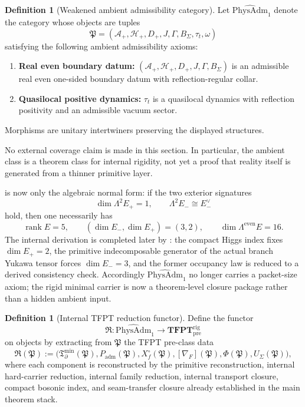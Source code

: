 \documentclass[11pt,a4paper]{article}
\theoremstyle{definition}
\newtheorem{definition}[theorem]{Definition}
\theoremstyle{remark}
\DeclareMathOperator{\rank}{rank}
\newcommand{\Tbound}{\mathfrak T_{\partial}^{\min}}
\newcommand{\Padm}{P_{\mathrm{adm}}}
\newcommand{\PhysAdmOne}{\widehat{\mathrm{PhysAdm}}_1}
\newcommand{\Runiv}{\mathfrak R}
\begin{document}
\begin{definition}[Weakened ambient admissibility category]
\label{def:physadm}
Let $\PhysAdmOne$ denote the category whose objects are tuples
\[
\mathfrak P=
(\mathcal A_+,\mathcal H_+,D_+,J,\Gamma,B_\Sigma,\tau_t,\omega)
\]
satisfying the following ambient admissibility axioms:
\begin{enumerate}[leftmargin=2em, topsep=3pt, itemsep=3pt]
    \item[\textbf{(U1)}] \textbf{Real even boundary datum:}
    $(\mathcal A_+,\mathcal H_+,D_+,J,\Gamma,B_\Sigma)$ is an admissible real even one-sided
    boundary datum with reflection-regular collar.
    \item[\textbf{(U4)}] \textbf{Quasilocal positive dynamics:}
    $\tau_t$ is a quasilocal dynamics with reflection positivity and an admissible vacuum sector.
\end{enumerate}
Morphisms are unitary intertwiners preserving the displayed structures.
\end{definition}

No external coverage claim is made in this section. In particular, the ambient class is a theorem
class for internal rigidity, not yet a proof that reality itself is generated from a thinner
primitive layer.

\begin{tcolorbox}[colback=orange!5, colframe=orange!70!black, breakable,
    title={Carrier closure is now split cleanly},
    colbacktitle=orange!75!black]
 is now only the algebraic normal form: if the two exterior
signatures
\[
\dim\Lambda^2E_+=1,
\qquad
\Lambda^2E_-\cong E_-^\vee
\]
hold, then one necessarily has
\[
\rank E=5,
\qquad
(\dim E_-,\dim E_+)=(3,2),
\qquad
\dim\Lambda^{\mathrm{even}}E=16.
\]
The internal derivation is completed later by :
the compact Higgs index fixes $\dim E_+=2$, the primitive indecomposable generator of the actual
branch Yukawa tensor forces $\dim E_-=3$, and the former occupancy law is reduced to a derived
consistency check.
Accordingly $\PhysAdmOne$ no longer carries a packet-size axiom; the rigid minimal carrier is now a
theorem-level closure package rather than a hidden ambient input.
\end{tcolorbox}

\begin{definition}[Internal TFPT reduction functor]
\label{def:universal-reduction}
Define the functor
\[
\Runiv:\PhysAdmOne\to \mathbf{TFPT}^{\mathrm{rig}}_{\mathrm{pre}}
\]
on objects by extracting from $\mathfrak P$ the TFPT pre-class data
\[
\Runiv(\mathfrak P):=
\bigl(
    \Tbound(\mathfrak P),
\Padm(\mathfrak P),
X_f^\circ(\mathfrak P),
[\nabla_F](\mathfrak P),
\Phi(\mathfrak P),
U_\Sigma(\mathfrak P)
\bigr),
\]
where each component is reconstructed by the primitive reconstruction, internal hard-carrier
reduction, internal family reduction, internal transport closure, compact bosonic index, and
seam-transfer closure already
established in the main theorem stack.
\end{definition}
\end{document}
